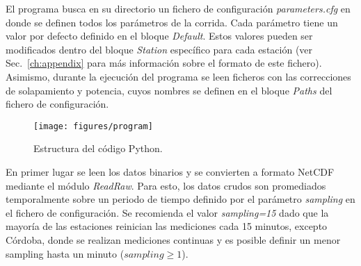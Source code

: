 \documentclass[12pt,a4paper,final]{report}
\begin{document}
	El programa busca en su directorio un fichero de configuración \emph{parameters.cfg} en donde se definen todos los parámetros de la corrida. Cada parámetro tiene un valor por defecto definido en el bloque \emph{Default}. Estos valores pueden ser modificados dentro del bloque \emph{Station} específico para cada estación (ver Sec.~\ref{ch:appendix} para más información sobre el formato de este fichero). Asimismo, durante la ejecución del programa se leen ficheros con las correcciones de solapamiento y potencia, cuyos nombres se definen en el bloque \emph{Paths} del fichero de configuración.
	
	\begin{figure}
		\begin{center}
			\texttt{[image: figures/program]}
		\end{center}
		\caption{
			Estructura del código Python.
		}
		\label{fig:program}
	\end{figure}
	
	En primer lugar se leen los datos binarios y se convierten a formato NetCDF mediante el módulo \emph{ReadRaw}. Para esto, los datos crudos son promediados temporalmente sobre un periodo de tiempo definido por el parámetro \emph{sampling} en el fichero de configuración. Se recomienda el valor \emph{sampling=15} dado que la mayoría de las estaciones reinician las mediciones cada 15 minutos, excepto Córdoba, donde se realizan mediciones continuas y es posible definir un menor sampling hasta un minuto ($sampling \ge 1$).
	
\end{document}
